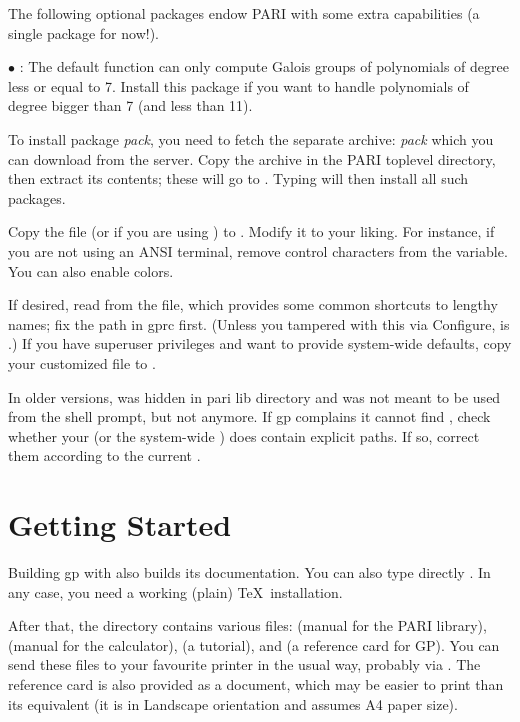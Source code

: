  The following optional packages endow PARI with some
extra capabilities (a single package for now!).

$\bullet$ : The default  function can only
compute Galois groups of polynomials of degree less or equal to 7. Install
this package if you want to handle polynomials of degree bigger than 7 (and
less than 11). \medskip

To install package \emph{pack}, you need to fetch the separate archive:
\emph{pack} which you can download from the  server.
Copy the archive in the PARI toplevel directory, then extract its
contents; these will go to . Typing  will then install all such packages.

 Copy the file  (or
 if you are using ) to . Modify
it to your liking. For instance, if you are not using an ANSI terminal,
remove control characters from the  variable. You can also
enable colors. 

If desired, read   from the 
file, which provides some common shortcuts to lengthy names; fix the path in
gprc first. (Unless you tampered with this via Configure,  is
.) If you have superuser privileges and want to
provide system-wide defaults, copy your customized  file to
.

In older versions,  was hidden in pari lib directory and was not
meant to be used from the shell prompt, but not anymore. If gp complains it
cannot find , check whether your  (or the system-wide
) does contain explicit paths. If so, correct them according to the
current .

\section{Getting Started}

 Building gp with  also builds
its documentation. You can also type directly . In any case,
you need a working (plain) \TeX\ installation.

After that, the  directory contains various  files:
 (manual for the PARI library),  (manual
for the  calculator),  (a tutorial), and
 (a reference card for GP). You can send these files to your
favourite printer in the usual way, probably via . The reference
card is also provided as a  document, which may be easier to
print than its  equivalent (it is in Landscape orientation and
assumes A4 paper size).

